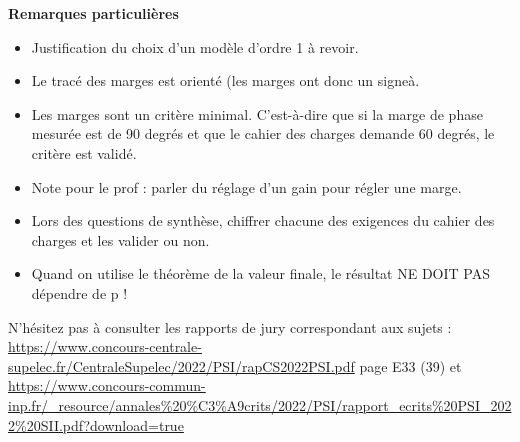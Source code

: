 \documentclass[10pt,fleqn]{article} %
\begin{document}
\textbf{Remarques particulières}
\begin{itemize}
\item Justification du choix d'un modèle d'ordre 1 à revoir. 
\item Le tracé des marges est orienté (les marges ont donc un signeà. 
\item Les marges sont un critère minimal. C'est-à-dire que si la marge de phase mesurée est de 90 degrés et que le cahier des charges demande 60 degrés, le critère est validé. 
\item Note pour le prof : parler du réglage d'un gain pour régler une marge.
\item  Lors des questions de synthèse, chiffrer chacune des exigences du cahier des charges et les valider ou non.
\item Quand on utilise le théorème de la valeur finale, le résultat NE DOIT PAS dépendre de p !
\end{itemize}

N'hésitez pas à consulter les rapports de jury correspondant aux sujets : 
\url{https://www.concours-centrale-supelec.fr/CentraleSupelec/2022/PSI/rapCS2022PSI.pdf} page E33 (39) et 
\url{https://www.concours-commun-inp.fr/_resource/annales%20%C3%A9crits/2022/PSI/rapport_ecrits%20PSI_2022%20SII.pdf?download=true}




%
\end{document}
